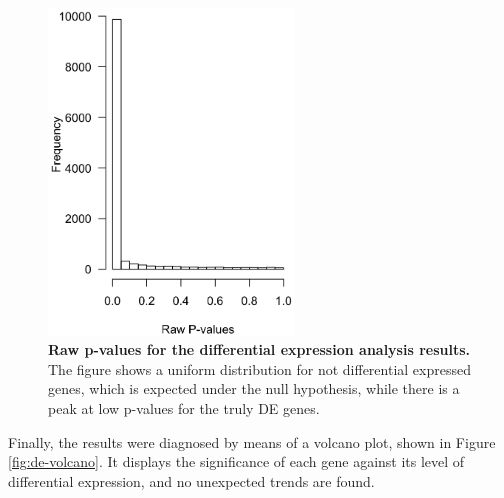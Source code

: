 \documentclass[9pt,twocolumn,twoside]{gsajnl}
\begin{document}
\begin{figure}[htbp]
\centering
\includegraphics[width=65mm, scale=0.75]{pval}
\caption{\textbf{Raw p-values for the differential expression analysis results.} The figure shows a uniform distribution for not differential expressed genes, which is expected under the null hypothesis, while there is a peak at low p-values for the truly DE genes.}
\label{fig:pval}
\end{figure}

Finally, the results were diagnosed by means of a volcano plot, shown in Figure \ref{fig:de-volcano}. It displays the significance of each gene against its level of differential expression, and no unexpected trends are found.
\end{document}
